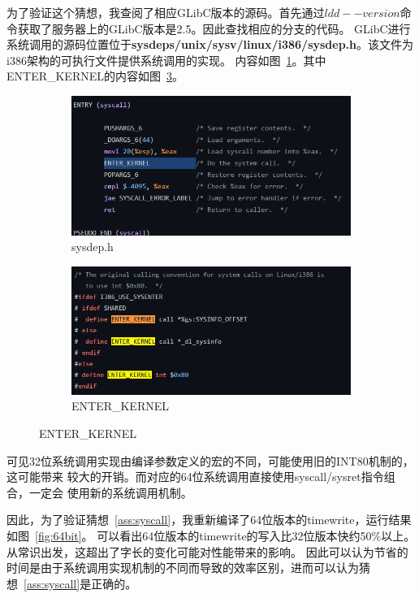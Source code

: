 \documentclass[a4paper,twoside]{article}
\begin{document}
\begin{spacing}{1.2}
为了验证这个猜想，我查阅了相应GLibC版本的源码。首先通过$ldd --version$命令获取了服务器上的GLibC版本是2.5。因此查找相应的分支的代码。
GLibC进行系统调用的源码位置位于\textbf{sysdeps/unix/sysv/linux/i386/sysdep.h}。该文件为i386架构的可执行文件提供系统调用的实现。
内容如图~\ref{fig:sysdepi386}。其中ENTER\_KERNEL的内容如图~\ref{fig:enterkernel}。

\begin{figure}[htbp]
	\centering
	\caption{GLibC的系统调用实现}
	\label{fig:acc}
	\begin{subfigure}{0.4\textwidth}
		\centering
		\caption{sysdep.h}
		\label{fig:sysdepi386}
		\includegraphics[width=\textwidth]{syscall_entry.png}
	\end{subfigure}
	\begin{subfigure}{0.4\textwidth}
		\centering
		\caption{ENTER\_KERNEL}
		\label{fig:enterkernel}
		\includegraphics[width=\textwidth]{syscall.png}
	\end{subfigure}
\end{figure}

可见32位系统调用实现由编译参数定义的宏的不同，可能使用旧的INT80机制的，这可能带来
较大的开销。而对应的64位系统调用直接使用syscall/sysret指令组合，一定会
使用新的系统调用机制。

因此，为了验证猜想~\ref{ass:syscall}，我重新编译了64位版本的timewrite，运行结果如图~\ref{fig:64bit}。
可以看出64位版本的timewrite的写入比32位版本快约50\%以上。从常识出发，这超出了字长的变化可能对性能带来的影响。
因此可以认为节省的时间是由于系统调用实现机制的不同而导致的效率区别，进而可以认为猜想~\ref{ass:syscall}是正确的。


\end{spacing}
\end{document}
